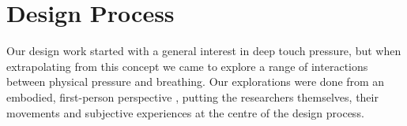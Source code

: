

\section{Design Process}
\label{subsec:chi_soma_design_process}


Our design work started with a general interest in deep touch pressure, but when extrapolating from this concept we came to explore a range of interactions between physical pressure and breathing. Our explorations were done from an embodied, first-person perspective \cite{hook_embracing_2018}, putting the researchers themselves, their movements and subjective experiences at the centre of the design process.

